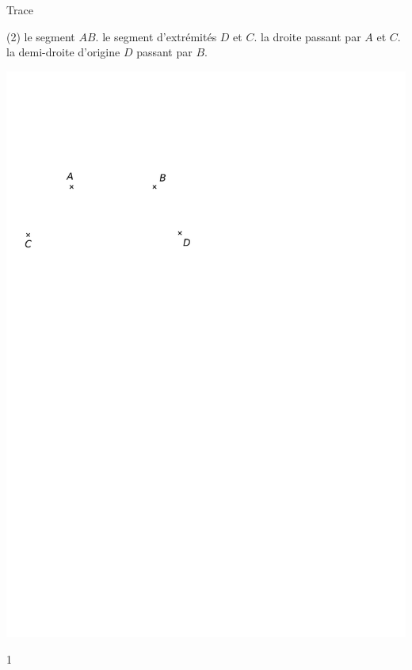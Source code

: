 \documentclass[a4paper,11pt]{report}
\begin{document}
\begin{exop}{Trace
		\vspace{-0.3cm}
\begin{tasks}[after-item-skip = 0.4em](2)
    \task le segment $AB$.
    \task le segment d'extrémités $D$ et $C$.
    \task la droite passant par $A$ et $C$.
    \task la demi-droite d'origine $D$ passant par $B$.
\end{tasks}
\begin{center}
\includegraphics[scale=0.8]{media/es-11/13-2}
\end{center}}
{1}
\end{exop}
\end{document}
